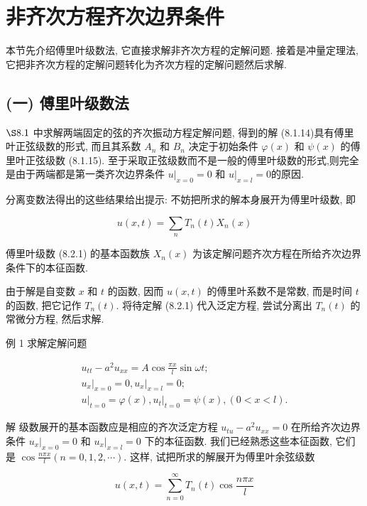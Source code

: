 
\section{非齐次方程齐次边界条件}



本节先介绍傅里叶级数法, 它直接求解非齐次方程的定解问题. 
接着是冲量定理法, 它把非齐次方程的定解问题转化为齐次方程的定解问题然后求解.

\subsection{(一) 傅里叶级数法}
$\S 8.1$ 中求解两端固定的弦的齐次振动方程定解问题, 得到的解 (8.1.14)具有傅里叶正弦级数的形式, 而且其系数 $A_{n}$ 和 $B_{n}$ 决定于初始条件 $\varphi(x)$ 和 $\psi(x)$ 的傅里叶正弦级数 (8.1.15). 至于采取正弦级数而不是一般的傅里叶级数的形式,则完全是由于两端都是第一类齐次边界条件 $\left.u\right|_{x=0}=0$ 和 $\left.u\right|_{x=l}=0$的原因.

分离变数法得出的这些结果给出提示: 不妨把所求的解本身展开为傅里叶级数, 即

$$
u(x, t)=\sum_{n} T_{n}(t) X_{n}(x)
$$

傅里叶级数 (8.2.1) 的基本函数族 $X_{n}(x)$ 为该定解问题齐次方程在所给齐次边界条件下的本征函数.

由于解是自变数 $x$ 和 $t$ 的函数, 因而 $u(x, t)$ 的傅里叶系数不是常数, 而是时间 $t$ 的函数, 把它记作 $T_{n}(t)$. 将待定解 (8.2.1) 代入泛定方程, 尝试分离出 $T_{n}(t)$ 的常微分方程, 然后求解.

例 1 求解定解问题

$$
\begin{gathered}
u_{t t}-a^{2} u_{x x}=A \cos \frac{\pi x}{l} \sin \omega t ; \\
\left.u_{x}\right|_{x=0}=0,\left.u_{x}\right|_{x=l}=0 ; \\
\left.u\right|_{t=0}=\varphi(x),\left.u_{t}\right|_{t=0}=\psi(x),(0<x<l) .
\end{gathered}
$$

解 级数展开的基本函数应是相应的齐次泛定方程 $u_{t u}-a^{2} u_{x x}=0$ 在所给齐次边界条件 $\left.u_{x}\right|_{x=0}=0$ 和 $\left.u_{x}\right|_{x=l}=0$ 下的本征函数. 我们已经熟悉这些本征函数, 它们是 $\cos \frac{n \pi x}{l}(n=0,1,2, \cdots)$. 这样, 试把所求的解展开为傅里叶余弦级数

$$
u(x, t)=\sum_{n=0}^{\infty} T_{n}(t) \cos \frac{n \pi x}{l}
$$


